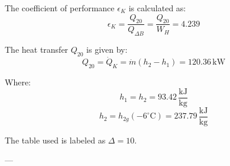 The coefficient of performance \( \epsilon_K \) is calculated as:  
\[
\epsilon_K = \frac{Q_{20}}{Q_{\Delta B}} = \frac{Q_{20}}{W_H} = 4.239
\]

The heat transfer \( Q_{20} \) is given by:  
\[
Q_{20} = \dot{Q}_K = \dot{m}(h_2 - h_1) = 120.36 \, \text{kW}
\]

Where:  
\[
h_1 = h_2 = 93.42 \, \frac{\text{kJ}}{\text{kg}}
\]  
\[
h_2 = h_{2g}(-6^\circ\text{C}) = 237.79 \, \frac{\text{kJ}}{\text{kg}}
\]  

The table used is labeled as \( \Delta = 10 \).

---